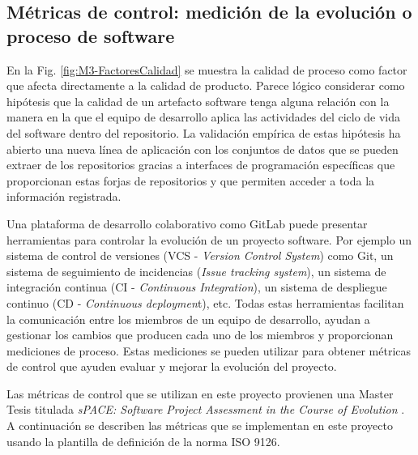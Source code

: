 \subsection{Métricas de control: medición de la evolución o proceso de software}\label{sect:3_3_2_MetricasControl}

En la Fig. \ref{fig:M3-FactoresCalidad} se muestra la calidad de proceso como factor que afecta directamente a la calidad de producto. Parece lógico considerar como hipótesis que la calidad de un artefacto software tenga alguna relación con la manera en la que el equipo de desarrollo aplica las actividades del ciclo de vida del software dentro del repositorio. La validación empírica de estas  hipótesis ha abierto una nueva línea de aplicación con los conjuntos de datos que se pueden extraer de los repositorios gracias a interfaces de programación específicas que proporcionan estas forjas de repositorios y que permiten acceder a toda la información registrada.

Una plataforma de desarrollo colaborativo como GitLab puede presentar herramientas para controlar la evolución de un proyecto software. Por ejemplo un sistema de control de versiones (VCS - \textit{Version Control System}) como Git, un sistema de seguimiento de incidencias (\textit{Issue tracking system}), un sistema de integración continua (CI - \textit{Continuous Integration}), un sistema de despliegue continuo (CD - \textit{Continuous deploymen}t), etc.
Todas estas herramientas facilitan la comunicación entre los miembros de un equipo de desarrollo, ayudan a gestionar los cambios que producen cada uno de los miembros y proporcionan mediciones de proceso. Estas mediciones se pueden utilizar para obtener métricas de control que ayuden evaluar y mejorar la evolución del proyecto.

Las métricas de control que se utilizan en este proyecto provienen una Master Tesis titulada \textit{sPACE: Software Project Assessment in the Course of Evolution} \citep{ratzinger_space:_2007}. 
A continuación se describen las métricas que se implementan en este proyecto usando la plantilla de definición de la norma ISO 9126.

 
